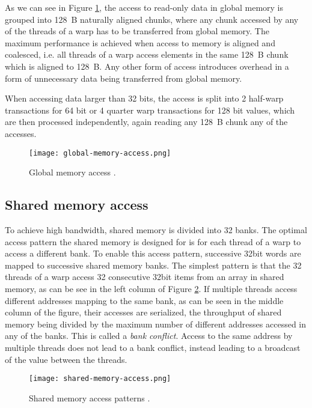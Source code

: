 As we can see in Figure \ref{fig:global_memory_access}, the access to read-only data in global memory is grouped into 128~B naturally aligned chunks, where any chunk accessed by any of the threads of a warp has to be transferred from global memory. The maximum performance is achieved when access to memory is aligned and coalesced, i.e. all threads of a warp access elements in the same 128~B chunk which is aligned to 128~B. Any other form of access introduces overhead in a form of unnecessary data being transferred from global memory. 

When accessing data larger than 32 bits, the access is split into 2 half-warp transactions for 64 bit or 4 quarter warp transactions for 128 bit values, which are then processed independently, again reading any 128~B chunk any of the accesses. 


\begin{figure}[h]
	\centering
	\texttt{[image: global-memory-access.png]}
	\caption{Global memory access \citep{site:cuda}.}
	\label{fig:global_memory_access}
\end{figure}

\subsection{Shared memory access}
To achieve high bandwidth, shared memory is divided into 32 banks. The optimal access pattern the shared memory is designed for is for each thread of a warp to access a different bank. To enable this access pattern, successive 32bit words are mapped to successive shared memory banks. The simplest pattern is that the 32 threads of a warp access 32 consecutive 32bit items from an array in shared memory, as can be see in the left column of Figure \ref{fig:shared_memory_access}. If multiple threads access different addresses mapping to the same bank, as can be seen in the middle column of the figure, their accesses are serialized, the throughput of shared memory being divided by the maximum number of different addresses accessed in any of the banks. This is called a \textit{bank conflict}. Access to the same address by multiple threads does not lead to a bank conflict, instead leading to a broadcast of the value between the threads.

\begin{figure}[h]
	\centering
	\texttt{[image: shared-memory-access.png]}
	\caption{Shared memory access patterns \citep{site:cuda}.}
	\label{fig:shared_memory_access}
\end{figure}

